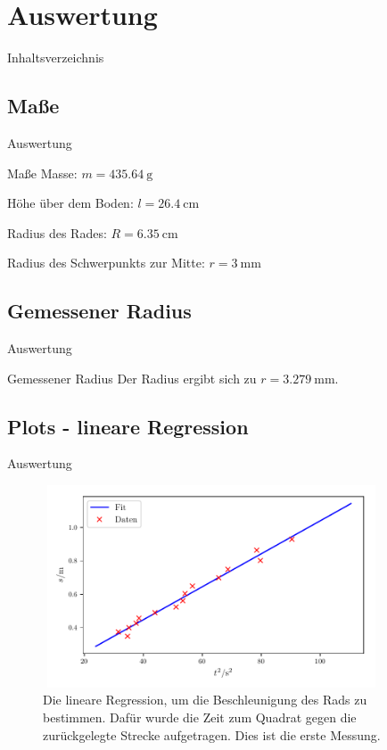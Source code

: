 \section{Auswertung}

\begin{frame}{Inhaltsverzeichnis}
\end{frame} 

\subsection{Maße}

\begin{frame}[t]{Auswertung}
    \begin{block}{Maße}
    Masse: $m = \SI{435.64}{\gram}$

    Höhe über dem Boden: $l= \SI{26.4}{\centi\meter}$
    
    Radius des Rades: $R =\SI{6.35}{\centi\meter}$
    
    Radius des Schwerpunkts zur Mitte: $r= \SI{3}{\milli\meter}$
    \end{block}
\end{frame}
\subsection{Gemessener Radius}
\begin{frame}[t]{Auswertung}

    \begin{block}{Gemessener Radius}
        Der Radius ergibt sich zu $r= \SI{3.279}{\milli\meter}$. 
    \end{block}
\end{frame}

\subsection{Plots - lineare Regression}

\begin{frame}{Auswertung}
    \begin{figure}   
    
    \centering
    \includegraphics[width=10cm, height=6cm]{build/plot1b.pdf}
    \caption{Die lineare Regression, um die Beschleunigung des Rads zu bestimmen. Dafür wurde die Zeit zum Quadrat gegen die zurückgelegte Strecke aufgetragen. Dies ist die erste Messung.} 

    \label{fig:plot1b}
\end{figure}
\end{frame}

